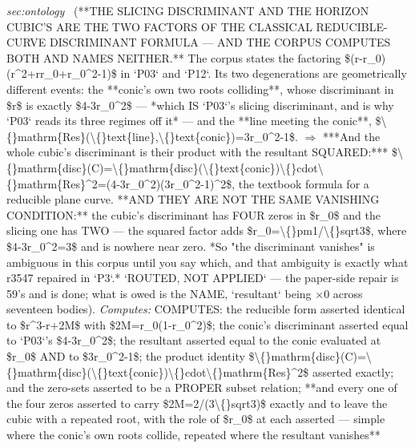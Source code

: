 \begin{description}
\textit{sec:ontology} \ (**THE SLICING DISCRIMINANT AND THE HORIZON CUBIC'S ARE THE TWO FACTORS OF THE CLASSICAL REDUCIBLE-CURVE DISCRIMINANT FORMULA --- AND THE CORPUS COMPUTES BOTH AND NAMES NEITHER.** The corpus states the factoring \$(r-r\_0)(r\textasciicircum{}2+rr\_0+r\_0\textasciicircum{}2-1)\$ in `P03` and `P12`. Its two degenerations are geometrically different events: the **conic's own two roots colliding**, whose discriminant in \$r\$ is exactly \$4-3r\_0\textasciicircum{}2\$ --- *which IS `P03`'s slicing discriminant, and is why `P03` reads its three regimes off it* --- and the **line meeting the conic**, \$\textbackslash\{\}mathrm\{Res\}(\textbackslash\{\}text\{line\},\textbackslash\{\}text\{conic\})=3r\_0\textasciicircum{}2-1\$. \ensuremath{\Rightarrow} ***And the whole cubic's discriminant is their product with the resultant SQUARED:*** \$\textbackslash\{\}mathrm\{disc\}(C)=\textbackslash\{\}mathrm\{disc\}(\textbackslash\{\}text\{conic\})\textbackslash\{\}cdot\textbackslash\{\}mathrm\{Res\}\textasciicircum{}2=(4-3r\_0\textasciicircum{}2)(3r\_0\textasciicircum{}2-1)\textasciicircum{}2\$, the textbook formula for a reducible plane curve.  **AND THEY ARE NOT THE SAME VANISHING CONDITION:** the cubic's discriminant has FOUR zeros in \$r\_0\$ and the slicing one has TWO --- the squared factor adds \$r\_0=\textbackslash\{\}pm1/\textbackslash\{\}sqrt3\$, where \$4-3r\_0\textasciicircum{}2=3\$ and is nowhere near zero. *So "the discriminant vanishes" is ambiguous in this corpus until you say which, and that ambiguity is exactly what r3547 repaired in `P3`.*  `ROUTED, NOT APPLIED` --- the paper-side repair is 59's and is done; what is owed is the NAME, `resultant` being \ensuremath{\times}0 across seventeen bodies). 
\emph{Computes:} COMPUTES: the reducible form asserted identical to \$r\textasciicircum{}3-r+2M\$ with \$2M=r\_0(1-r\_0\textasciicircum{}2)\$; the conic's discriminant asserted equal to `P03`'s \$4-3r\_0\textasciicircum{}2\$; the resultant asserted equal to the conic evaluated at \$r\_0\$ AND to \$3r\_0\textasciicircum{}2-1\$; the product identity \$\textbackslash\{\}mathrm\{disc\}(C)=\textbackslash\{\}mathrm\{disc\}(\textbackslash\{\}text\{conic\})\textbackslash\{\}cdot\textbackslash\{\}mathrm\{Res\}\textasciicircum{}2\$ asserted exactly; and the zero-sets asserted to be a PROPER subset relation; **and every one of the four zeros asserted to carry \$\textbar{}2M\textbar{}=2/(3\textbackslash\{\}sqrt3)\$ exactly and to leave the cubic with a repeated root, with the role of \$r\_0\$ at each asserted --- simple where the conic's own roots collide, repeated where the resultant vanishes**

\end{description}
